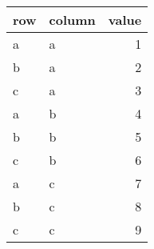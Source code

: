 \begin{tabular}{llr}
  \toprule
 row & column & value \\ 
  \midrule
  a & a &   1 \\ 
  b & a &   2 \\ 
  c & a &   3 \\ 
  a & b &   4 \\ 
  b & b &   5 \\ 
  c & b &   6 \\ 
  a & c &   7 \\ 
  b & c &   8 \\ 
  c & c &   9 \\ 
   \bottomrule
\end{tabular}
